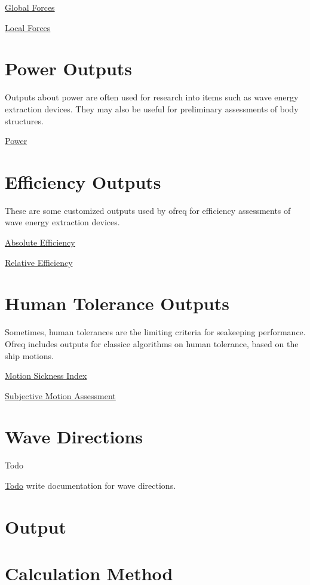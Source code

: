 \hyperlink{global_force}{Global Forces}

\hyperlink{local_force}{Local Forces}

\section*{Power Outputs}

Outputs about power are often used for research into items such as wave energy extraction devices. They may also be useful for preliminary assessments of body structures.

\hyperlink{power}{Power}

\section*{Efficiency Outputs}

These are some customized outputs used by ofreq for efficiency assessments of wave energy extraction devices.

\hyperlink{efficiency_absolute}{Absolute Efficiency}

\hyperlink{efficiency_relative}{Relative Efficiency}

\section*{Human Tolerance Outputs}

Sometimes, human tolerances are the limiting criteria for seakeeping performance. Ofreq includes outputs for classice algorithms on human tolerance, based on the ship motions.

\hyperlink{local_msi}{Motion Sickness Index}

\hyperlink{local_sma}{Subjective Motion Assessment} \hypertarget{wave_directions}{}\section{Wave Directions}\label{wave_directions}
\begin{DoxyRefDesc}{Todo}
\item[\hyperlink{todo__todo000025}{Todo}]write documentation for wave directions. \end{DoxyRefDesc}


\section*{Output}

\section*{Calculation Method}

